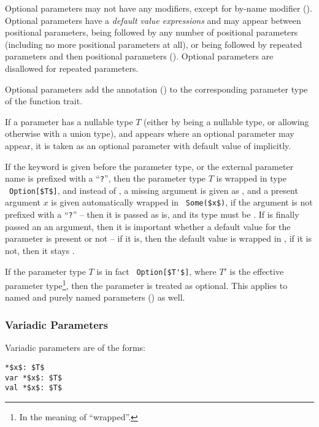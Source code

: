 Optional parameters may not have any modifiers, except for by-name modifier (). Optional parameters have a {\em default value expressions} and may appear between positional parameters, being followed by any number of positional parameters (including no more positional parameters at all), or being followed by repeated parameters and then positional parameters (). Optional parameters are disallowed for repeated parameters. 

Optional parameters add the annotation ()  to the corresponding parameter type of the function trait. 

If a parameter has a nullable type $T$ (either by being a nullable type, or allowing otherwise  with a union type), and appears where an optional parameter may appear, it is taken as an optional parameter with default value of  implicitly. 

If the keyword  is given before the parameter type, or the external parameter name is prefixed with a ``\lstinline!?!'', then the parameter type $T$ is wrapped in type ~\lstinline!Option[$T$]!, and instead of , a missing argument is given as , and a present argument $x$ is given automatically wrapped in ~\lstinline!Some($x$)!, if the argument is not prefixed with a ``\lstinline!?!'' -- then it is passed as is, and its type must be . If  is finally passed an an argument, then it is important whether a default value for the parameter is present or not -- if it is, then the default value is wrapped in , if it is not, then it stays . 

If the parameter type $T$ is in fact ~\lstinline!Option[$T'$]!, where $T'$ is the effective parameter type\footnote{In the meaning of ``wrapped''.}, then the parameter is treated as optional. This applies to named and purely named parameters () as well. 





\subsubsection{Variadic Parameters}
\label{sec:variadic-parameters}

Variadic parameters are of the forms:
\begin{lstlisting}
*$x$: $T$
var *$x$: $T$
val *$x$: $T$
\end{lstlisting}

